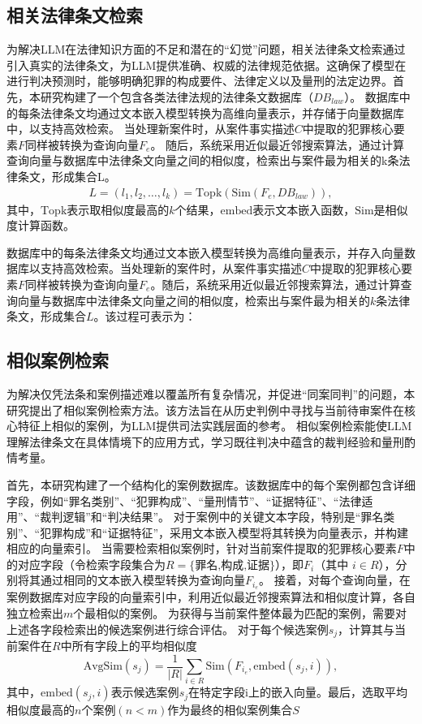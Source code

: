 \subsection{\heiti 相关法律条文检索}
为解决LLM在法律知识方面的不足和潜在的“幻觉”问题，相关法律条文检索通过引入真实的法律条文，为LLM提供准确、权威的法律规范依据。这确保了模型在进行判决预测时，能够明确犯罪的构成要件、法律定义以及量刑的法定边界。首先，本研究构建了一个包含各类法律法规的法律条文数据库（$DB_{law}$​​）。
数据库中的每条法律条文均通过文本嵌入模型转换为高维向量表示，并存储于向量数据库中，以支持高效检索。
当处理新案件时，从案件事实描述$C$中提取的犯罪核心要素$F$同样被转换为查询向量$F_e$​。
随后，系统采用近似最近邻搜索算法，通过计算查询向量与数据库中法律条文向量之间的相似度，检索出与案件最为相关的k条法律条文，形成集合L。
\begin{equation}
	\begin{aligned}
		L  =(l_1​,l_2​,\dots,l_k​)
		=\text{Topk}​(\text{Sim}(F_{e},DB_{law})),
	\end{aligned}
	\label{eq:L}
\end{equation}
其中，$\text{Topk}​$表示取相似度最高的$k$个结果，$\text{embed}$表示文本嵌入函数，$\text{Sim}$是相似度计算函数。


数据库中的每条法律条文均通过文本嵌入模型转换为高维向量表示，并存入向量数据库以支持高效检索。当处理新的案件时，从案件事实描述$C$中提取的犯罪核心要素$F$同样被转换为查询向量$F_{e}$。随后，系统采用近似最近邻搜索算法，通过计算查询向量与数据库中法律条文向量之间的相似度，检索出与案件最为相关的$k$条法律条文，形成集合$L$。该过程可表示为：

\subsection{\heiti 相似案例检索}
为解决仅凭法条和案例描述难以覆盖所有复杂情况，并促进“同案同判”的问题，本研究提出了相似案例检索方法。该方法旨在从历史判例中寻找与当前待审案件在核心特征上相似的案例，为LLM提供司法实践层面的参考。
相似案例检索能使LLM理解法律条文在具体情境下的应用方式，学习既往判决中蕴含的裁判经验和量刑酌情考量。

首先，本研究构建了一个结构化的案例数据库。该数据库中的每个案例都包含详细字段，例如“罪名类别”、“犯罪构成”、“量刑情节”、“证据特征”、“法律适用”、“裁判逻辑”和“判决结果”。
对于案例中的关键文本字段，特别是“罪名类别”、“犯罪构成”和“证据特征”，采用文本嵌入模型将其转换为向量表示，并构建相应的向量索引。
当需要检索相似案例时，针对当前案件提取的犯罪核心要素$F$中的对应字段（令检索字段集合为$R=\{\text{罪名,构成,证据}\}$），即$F_i$​（其中 $i\in R$），分别将其通过相同的文本嵌入模型转换为查询向量$F_{i_e}$​​。
接着，对每个查询向量，在案例数据库对应字段的向量索引中，利用近似最近邻搜索算法和相似度计算，各自独立检索出$m$个最相似的案例。
为获得与当前案件整体最为匹配的案例，需要对上述各字段检索出的候选案例进行综合评估。
对于每个候选案例$s_j$​，计算其与当前案件在$R$中所有字段上的平均相似度
{
\small
\begin{equation}
    \text{AvgSim}(s_j) = \frac{1}{|R|} \sum_{i \in R} \text{Sim}\left( F_{i_e}, \text{embed}(s_j, i) \right),
\end{equation}
}
其中，$\text{embed}(s_j,i)$表示候选案例$s_j$​在特定字段$\text{i}$上的嵌入向量。最后，选取平均相似度最高的$n$个案例$(n<m)$作为最终的相似案例集合$S$

